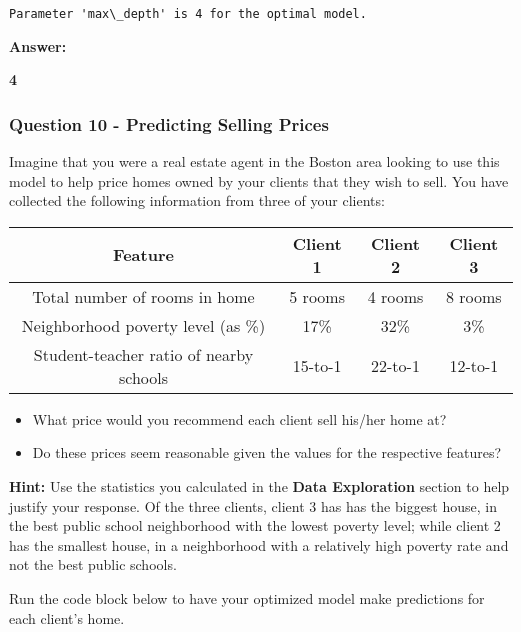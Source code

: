 \documentclass[11pt]{article}
\providecommand{\tightlist}{%
      \setlength{\itemsep}{0pt}\setlength{\parskip}{0pt}}
\begin{document}
    \begin{Verbatim}[commandchars=\\\{\}]
Parameter 'max\_depth' is 4 for the optimal model.

    \end{Verbatim}

    \textbf{Answer:}

\textbf{4}

    \hypertarget{question-10---predicting-selling-prices}{%
\subsubsection{Question 10 - Predicting Selling
Prices}\label{question-10---predicting-selling-prices}}

Imagine that you were a real estate agent in the Boston area looking to
use this model to help price homes owned by your clients that they wish
to sell. You have collected the following information from three of your
clients:

\begin{longtable}[]{@{}cccc@{}}
\toprule
Feature & Client 1 & Client 2 & Client 3\tabularnewline
\midrule
\endhead
Total number of rooms in home & 5 rooms & 4 rooms & 8
rooms\tabularnewline
Neighborhood poverty level (as \%) & 17\% & 32\% & 3\%\tabularnewline
Student-teacher ratio of nearby schools & 15-to-1 & 22-to-1 &
12-to-1\tabularnewline
\bottomrule
\end{longtable}

\begin{itemize}
\tightlist
\item
  What price would you recommend each client sell his/her home at?
\item
  Do these prices seem reasonable given the values for the respective
  features?
\end{itemize}

\textbf{Hint:} Use the statistics you calculated in the \textbf{Data
Exploration} section to help justify your response. Of the three
clients, client 3 has has the biggest house, in the best public school
neighborhood with the lowest poverty level; while client 2 has the
smallest house, in a neighborhood with a relatively high poverty rate
and not the best public schools.

Run the code block below to have your optimized model make predictions
for each client's home.
\end{document}
